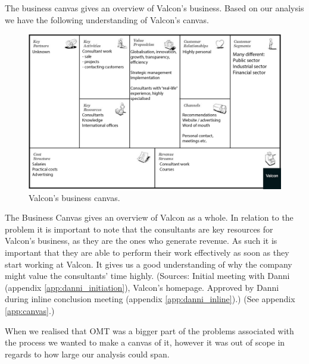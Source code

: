 The business canvas gives an overview of Valcon's business.
Based on our analysis we have the following understanding of Valcon's canvas.
\begin{figure}[!htp]
\includegraphics[width=\textwidth]{inline/business-model-canvas.png}
\caption{Valcon's business canvas.}
\label{fig:canvas}
\end{figure}

The Business Canvas gives an overview of Valcon as a whole. In relation to the problem it is important to note that the consultants are key resources for Valcon's business, as they are the ones who generate revenue.
As such it is important that they are able to perform their work effectively as soon as they start working at Valcon. It gives us a good understanding of why the company might value the consultants' time highly. (Sources: Initial meeting with Danni (appendix \ref{app:danni_initiation}), Valcon's homepage. Approved by Danni during inline conclusion meeting (appendix \ref{app:danni_inline}).) (See appendix \ref{app:canvas}.)

When we realised that OMT was a bigger part of the problems associated with the process we wanted to make a canvas of it, however it was out of scope in regards to how large our analysis could span.